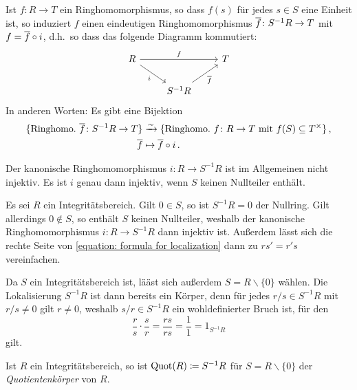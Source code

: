 \begin{theorem}
  Ist $f \colon R \to T$ ein Ringhomomorphismus, so dass $f(s)$ für jedes $s \in S$ eine Einheit ist, so induziert $f$ einen eindeutigen Ringhomomorphismus $\overline{f} \colon S^{-1} R \to T$ mit $f = \overline{f} \circ i$, d.h.\ so dass das folgende Diagramm kommutiert:
  \[
    \begin{tikzcd}
        R
        \arrow{rr}[above]{f}
        \arrow{dr}[below left]{i}
      & {}
      & T
      \\
        {}
      & S^{-1} R
        \arrow{ur}[below right]{\induced{f}}
      & {}
    \end{tikzcd}
  \]
  In anderen Worten:
  Es gibt eine Bijektion
  \begin{align*}
                        \{ \text{Ringhomo.\ $\overline{f} \colon S^{-1} R \to T$} \}
    &\xrightarrow{\sim} \{ \text{Ringhomo.\ $f \colon R \to T$ mit $f(S) \subseteq T^{\times}$} \} \,,  \\
                        \overline{f}
    &\mapsto            \overline{f} \circ i \,.
  \end{align*}
\end{theorem}

\begin{warning}
  Der kanonische Ringhomomorphismus $i \colon R \to S^{-1} R$ ist im Allgemeinen nicht injektiv.
  Es ist $i$ genau dann injektiv, wenn $S$ keinen Nullteiler enthält.
\end{warning}

Es sei $R$ ein Integritätsbereich.
Gilt $0 \in S$, so ist $S^{-1} R = 0$ der Nullring.
Gilt allerdings $0 \notin S$, so enthält $S$ keinen Nullteiler, weshalb der kanonische Ringhomomorphismus $i \colon R \to S^{-1} R$ dann injektiv ist.
Außerdem lässt sich die rechte Seite von \eqref{equation: formula for localization} dann zu $rs' = r's$ vereinfachen.

Da $S$ ein Integritätsbereich ist, lääst sich außerdem $S = R \smallsetminus \{0\}$ wählen.
Die Lokalisierung $S^{-1} R$ ist dann bereits ein Körper, denn für jedes $r/s \in S^{-1} R$ mit $r/s \neq 0$ gilt $r \neq 0$, weshalb $s/r \in S^{-1} R$ ein wohldefinierter Bruch ist, für den
\[
        \frac{r}{s}
  \cdot \frac{s}{r}
  =     \frac{rs}{rs}
  =     \frac{1}{1}
  =     1_{S^{-1} R}
\]
gilt.

\begin{definition}
  Ist $R$ ein Integritätsbereich, so ist $\operatorname{Quot}(R) \coloneqq S^{-1} R$ für $S = R \smallsetminus \{0\}$ der \emph{Quotientenkörper} von $R$.
\end{definition}

